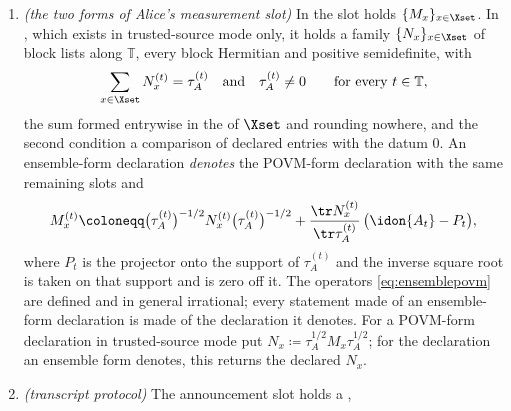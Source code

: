 \begin{definition}
\begin{enumerate}[label=(DX\arabic*),leftmargin=3.2em]
POVM on $\Qsys$, block diagonal for the product sector map with the blocks of
\eqref{eq:productfamily}, follows for the exact numbers the factors declare:
a tensor product of Hermitian positive semidefinite operators is Hermitian
and positive semidefinite,
$\sum_{v}\bigotimes_fF^{f}_{v_f}=\bigotimes_f\sum_{v_f}F^{f}_{v_f}
=\idon{\Qsys}$ by multilinearity, and the tensor product distributes over the
direct sums $F^{f}_{v_f}=\bigoplus_{s_f}F^{f,(s_f)}_{v_f}$.
\item \emph{(the two forms of Alice's measurement slot)} In
the slot holds $\{M_x\}_{x\in\Xset}$. In
,
which exists in trusted-source mode only, it holds a family
$\{N_x\}_{x\in\Xset}$ of block lists along $\mathbb{T}$, every block
Hermitian and positive semidefinite, with
\begin{equation}\label{eq:ensembleform}
  \sum_{x\in\Xset}N^{(t)}_x=\tau^{(t)}_A
  \quad\text{and}\quad\tau^{(t)}_A\ne0
  \qquad\text{for every }t\in\mathbb{T},
\end{equation}
the sum formed entrywise in the  of $\Xset$ and
rounding nowhere, and the second condition a comparison of declared entries with the
datum $0$. An ensemble-form declaration \emph{denotes} the POVM-form
declaration with the same remaining slots and
\begin{equation}\label{eq:ensemblepovm}
  M^{(t)}_x\coloneqq\big(\tau^{(t)}_A\big)^{-1/2}N^{(t)}_x
  \big(\tau^{(t)}_A\big)^{-1/2}
  +\frac{\tr N^{(t)}_x}{\tr\tau^{(t)}_A}\,\big(\idon{A_t}-P_t\big),
\end{equation}
where $P_t$ is the projector onto the support of $\tau^{(t)}_A$ and the
inverse square root is taken on that support and is zero off it. The
operators \eqref{eq:ensemblepovm} are defined and in general irrational; every statement made of an
ensemble-form declaration is made of the declaration it denotes. For a
POVM-form declaration in trusted-source mode put
$N_x\coloneqq\tau_A^{1/2}M_x\tau_A^{1/2}$; for the declaration an ensemble
form denotes, this returns the declared $N_x$.
\item \emph{(transcript protocol)} The announcement slot holds a
,

\end{enumerate}
\end{definition}
